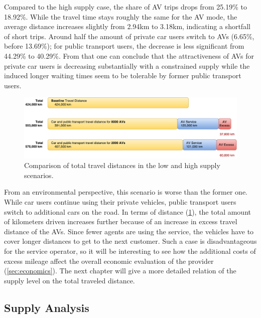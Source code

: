 Compared to the high supply case, the share of AV trips drops from 25.19\% to
18.92\%. While the travel time stays roughly the same for the AV mode, the
average distance increases slightly from 2.94km to 3.18km, indicating a shortfall
of short trips. Around half the amount of private car users
switch to AVs (6.65\%, before 13.69\%); for public transport users, the decrease
is less significant from 44.29\% to 40.29\%. From that one can conclude that the
attractiveness of AVs for private car users is decreasing substantially with a
constrained supply while the induced longer waiting times seem to be tolerable
by former public transport users.

\begin{figure}
    \centering
    \includegraphics[width=1.0\textwidth]{figures/traveldistances.pdf}
    \caption{Comparison of total travel distances in the low and high supply scenarios.}
    \label{fig:traveldistances}
\end{figure}

From an environmental perspective, this scenario
is worse than the former one. While car users continue using their private vehicles,
public transport users switch to additional cars on the road. In terms of distance
(\cref{fig:traveldistances}), the total amount of kilometers driven increases further
because of an increase in excess travel distance of the AVs. Since fewer agents are
using the service, the vehicles have to cover longer distances to get to the next
customer. Such a case is disadvantageous for the service operator, so it will be
interesting to see how the additional costs of excess mileage affect the overall
economic evaluation of the provider (\cref{sec:economics}). The next chapter will
give a more detailed relation of the supply level on the total traveled distance.

\subsection{Supply Analysis}
\label{sec:waitingtimes}

